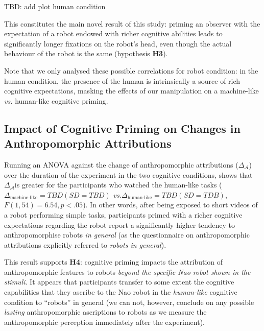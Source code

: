 \documentclass[lettersize, noapacite, twoside, HRI]{apa_HRI}
\newcommand{\vs}{\textit{vs.}\xspace}
\newcommand{\h}[1]{\textbf{H#1}\xspace}
\newcommand{\anti}{{$\mathcal{A}_{start}$\xspace}}
\newcommand{\antf}{{$\mathcal{A}_{end}$\xspace}}
\newcommand{\deltaant}{{$\Delta_{\mathcal{A}}$\xspace}}
\begin{document}
TBD: add plot human condition

This constitutes the main novel result of this study: priming an observer with
the expectation of a robot endowed with richer cognitive abilities leads to significantly longer
fixations on the robot's head, even though the actual behaviour of the robot is
the same (hypothesis \h{3}).

Note that we only analysed these possible correlations for robot condition: in
the human condition, the presence of the human is intrinsically a source of rich
cognitive expectations, masking the effects of our manipulation on a
machine-like \vs human-like cognitive priming.


\subsection{Impact of Cognitive Priming on Changes in Anthropomorphic
Attributions}

Running an ANOVA against the change of anthropomorphic attributions
(\deltaant) over the duration of the experiment in the two cognitive
conditions, shows that \deltaant is greater for the participants who watched the
human-like tasks ($\Delta_{\text{machine-like}}=TBD (SD=TBD)$
\vs $\Delta_{\text{human-like}}=TBD (SD=TDB)$, $F(1,54) = 6.54, p < .05$). In other words, after being exposed to short videos of a robot
performing simple tasks, participants primed with a richer cognitive
expectations regarding the robot report a significantly higher tendency to anthropomorphise robots
\emph{in general} (as the questionnaire on anthropomorphic attributions
explicitly referred to \emph{robots in general}).


This result supports \h{4}: cognitive priming impacts the
attribution of anthropomorphic features to robots \emph{beyond the specific Nao robot
shown in the stimuli}.  It appears that participants transfer to some extent the
cognitive capabilities that they ascribe to the Nao robot in the
\emph{human-like} cognitive condition to ``robots'' in general (we can not, however,
conclude on any possible \emph{lasting} anthropomorphic ascriptions to robots as we
measure the anthropomorphic perception immediately after the experiment).
\end{document}
